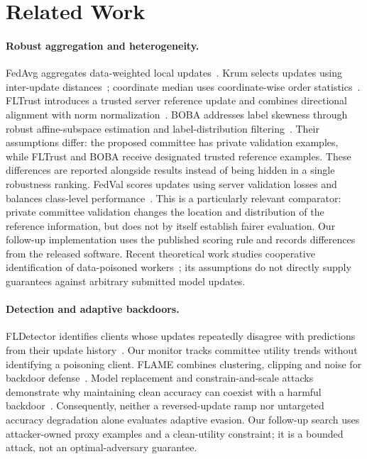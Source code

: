 \section{Related Work}
\paragraph{Robust aggregation and heterogeneity.}
FedAvg aggregates data-weighted local updates~\cite{mcmahan2017}.
Krum selects updates using inter-update distances~\cite{blanchard2017};
coordinate median uses coordinate-wise order statistics~\cite{yin2018}.
FLTrust introduces a trusted server reference update and combines directional
alignment with norm normalization~\cite{cao2021}. BOBA addresses label skewness
through robust affine-subspace estimation and label-distribution
filtering~\cite{bao2024}. Their assumptions differ: the proposed committee has
private validation examples, while FLTrust and BOBA receive designated trusted
reference examples. These differences are reported alongside results instead of
being hidden in a single robustness ranking.
FedVal scores updates using server validation losses and balances class-level
performance~\cite{valadi2023}. This is a particularly relevant comparator:
private committee validation changes the location and distribution of the
reference information, but does not by itself establish fairer evaluation.
Our follow-up implementation uses the published scoring rule and records
differences from the released software. Recent theoretical work studies
cooperative identification of data-poisoned workers~\cite{yu2026}; its assumptions
do not directly supply guarantees against arbitrary submitted model updates.

\paragraph{Detection and adaptive backdoors.}
FLDetector identifies clients whose updates repeatedly disagree with predictions
from their update history~\cite{zhang2022detector}. Our monitor tracks committee
utility trends without identifying a poisoning client. FLAME combines
clustering, clipping and noise for backdoor
defense~\cite{nguyen2022flame}. Model replacement and constrain-and-scale attacks
demonstrate why maintaining clean accuracy can coexist with a harmful
backdoor~\cite{bagdasaryan2020}. Consequently, neither a reversed-update ramp
nor untargeted accuracy degradation alone evaluates adaptive evasion. Our
follow-up search uses attacker-owned proxy examples and a clean-utility
constraint; it is a bounded attack, not an optimal-adversary guarantee.

